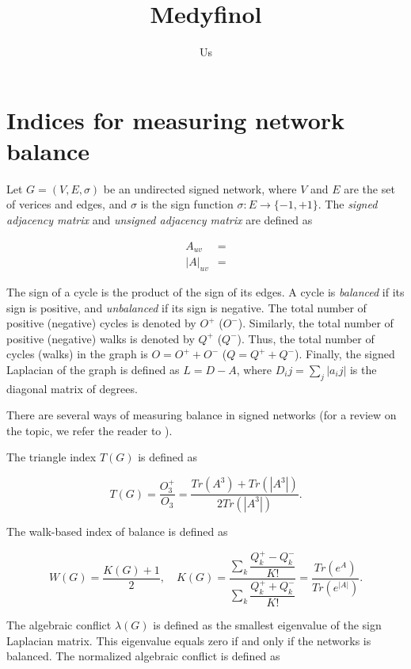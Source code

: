 \documentclass[10pt]{article}
\begin{document}
	
\title{Medyfinol}
\author{\small{Us}}


\section{Indices for measuring network balance}

Let $G = (V, E, \sigma)$ be an undirected signed network, where $V$ and $E$ are the set of verices and edges, and $\sigma$ is the sign function $\sigma: E \rightarrow \lbrace -1, +1\rbrace$. The \emph{signed adjacency matrix} and \emph{unsigned adjacency matrix} are defined as 

\begin{align}
A_{uv} &= \\
|A|_{uv} &= 
\end{align}

The sign of a cycle is the product of the sign of its edges. A cycle is \emph{balanced} if its sign is positive, and \emph{unbalanced} if its sign is negative. The total number of positive (negative) cycles is denoted by $O^{+}$ ($O^{-}$). Similarly, the total number of positive (negative) walks is denoted by  $Q^{+}$ ($Q^{-}$). Thus, the total number of cycles (walks) in the graph is $O = O^{+} + O^{-}$ ($Q = Q^{+} + Q^{-}$). Finally, the signed Laplacian of the graph is defined as $L = D-A$, where $D_ij = \sum_j |a_ij|$ is the diagonal matrix of degrees. 

There are several ways of measuring balance in signed networks (for a review on the topic, we refer the reader to \cite{Aref2018}).

The triangle index $T(G)$  is defined as 

\begin{equation}
T(G) = \dfrac{O^+_3}{O_3} = \dfrac{Tr(A^3) + Tr(|A^3|)}{2Tr(|A^3|)}.
\end{equation}

The walk-based index of balance is defined as 

\begin{equation}
W(G) = \dfrac{K(G) + 1}{2}, \quad K(G) = \dfrac{\sum_k\dfrac{Q^{+}_k - Q^{-}_k}{K!}}{\sum_k\dfrac{Q^{+}_k + Q^{-}_k}{K!}} = \dfrac{Tr(e^{A})}{Tr(e^{|A|})}.
\end{equation}

The algebraic conflict $\lambda(G)$ is defined as the smallest eigenvalue of the sign Laplacian matrix. This eigenvalue equals zero if and only if the networks is balanced. The normalized algebraic conflict is defined as 
\end{document}
